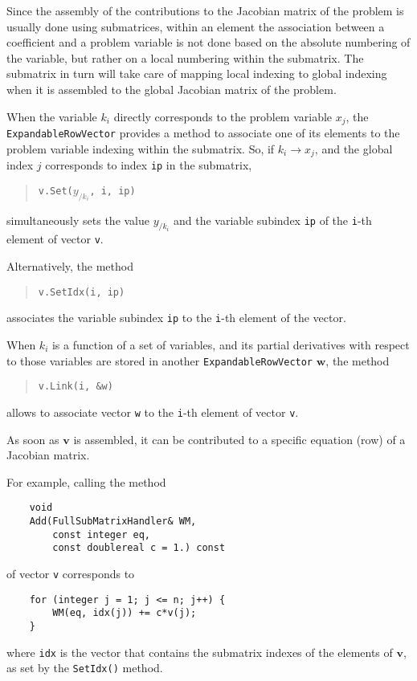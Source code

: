 \documentclass[10pt,dvips,fleqn,subeqn]{report}
\newcommand{\T}[1]{\bm{#1}}
\begin{document}
Since the assembly of the contributions to the Jacobian matrix of the problem
is usually done using submatrices, within an element the association between
a coefficient and a problem variable is not done based on the absolute numbering
of the variable, but rather on a local numbering within the submatrix.
The submatrix in turn will take care of mapping local indexing to global indexing
when it is assembled to the global Jacobian matrix of the problem.

When the variable $k_i$ directly corresponds to the problem variable $x_j$,
the \texttt{ExpandableRowVector} provides a method to associate
one of its elements to the problem variable indexing within the submatrix.
So, if $k_i\rightarrow x_j$, and the global index $j$ corresponds
to index \texttt{ip} in the submatrix,
\begin{quote}
\texttt{v.Set($y_{/k_i}$, i, ip)}
\end{quote}
simultaneously sets the value $y_{/k_i}$
and the variable subindex \texttt{ip}
of the \texttt{i}-th element of vector \texttt{v}.

Alternatively, the method
\begin{quote}
\texttt{v.SetIdx(i, ip)}
\end{quote}
associates the variable subindex \texttt{ip}
to the \texttt{i}-th element of the vector.

When $k_i$ is a function of a set of variables,
and its partial derivatives with respect to those variables
are stored in another \texttt{ExpandableRowVector} $\T{w}$,
the method
\begin{quote}
\texttt{v.Link(i, \&w)}
\end{quote}
allows to associate vector \texttt{w} to the \texttt{i}-th element
of vector \texttt{v}.

As soon as $\T{v}$ is assembled, it can be contributed
to a specific equation (row) of a Jacobian matrix.

For example, calling the method
\begin{verbatim}
    void
    Add(FullSubMatrixHandler& WM,
        const integer eq,
        const doublereal c = 1.) const
\end{verbatim}
of vector \texttt{v} corresponds to
\begin{verbatim}
    for (integer j = 1; j <= n; j++) {
        WM(eq, idx(j)) += c*v(j);
    }
\end{verbatim}
where \texttt{idx} is the vector that contains the submatrix indexes
of the elements of $\T{v}$, as set by the \texttt{SetIdx()} method.
\end{document}
